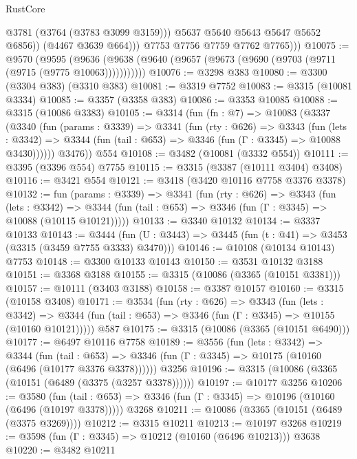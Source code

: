 \begin{lexlean}{RustCore}
\begin{coremodule}
                    @3781
                    (@3764 (@3783 @3099 @3159)))
                  @5637
                  @5640
                  @5643
                  @5647
                  @5652
                  @6856))
              (@4467 @3639 @664)))
          @7753
          @7756
          @7759
          @7762
          @7765)))
@10075 := @9570
    (@9595 (@9636 (@9638 (@9640 (@9657 (@9673 (@9690 (@9703 (@9711 (@9715 (@9775 @10063)))))))))))
@10076 := @3298 @383
@10080 := @3300 (@3304 @383) (@3310 @383)
@10081 := @3319 @7752
@10083 := @3315 (@10081 @3334)
@10085 := @3357 (@3358 @383)
@10086 := @3353 @10085
@10088 := @3315 (@10086 @3383)
@10105 := @3314
    (fun (fn : @7) =>
    @10083
      (@3337
        (@3340
          (fun (params : @3339) =>
          @3341
            (fun (rty : @626) =>
            @3343
              (fun (lets : @3342) =>
              @3344 (fun (tail : @653) => @3346 (fun (Γ : @3345) => @10088 @3430))))))
        @3476))
    @554
@10108 := @3482 (@10081 (@3332 @554))
@10111 := @3395 (@3396 @554) @7755
@10115 := @3315 (@3387 (@10111 @3404) @3408)
@10116 := @3421 @554
@10121 := @3418 (@3420 @10116 @7758 @3376 @3378)
@10132 := fun (params : @3339) =>
  @3341
    (fun (rty : @626) =>
    @3343
      (fun (lets : @3342) =>
      @3344 (fun (tail : @653) => @3346 (fun (Γ : @3345) => @10088 (@10115 @10121)))))
@10133 := @3340 @10132
@10134 := @3337 @10133
@10143 := @3444
    (fun (U : @3443) => @3445 (fun (t : @41) => @3453 (@3315 (@3459 @7755 @3333) @3470)))
@10146 := @10108 (@10134 @10143) @7753
@10148 := @3300 @10133 @10143
@10150 := @3531 @10132 @3188
@10151 := @3368 @3188
@10155 := @3315 (@10086 (@3365 (@10151 @3381)))
@10157 := @10111 (@3403 @3188)
@10158 := @3387 @10157
@10160 := @3315 (@10158 @3408)
@10171 := @3534
    (fun (rty : @626) =>
    @3343
      (fun (lets : @3342) =>
      @3344 (fun (tail : @653) => @3346 (fun (Γ : @3345) => @10155 (@10160 @10121)))))
    @587
@10175 := @3315 (@10086 (@3365 (@10151 @6490)))
@10177 := @6497 @10116 @7758
@10189 := @3556
    (fun (lets : @3342) =>
    @3344
      (fun (tail : @653) =>
      @3346 (fun (Γ : @3345) => @10175 (@10160 (@6496 (@10177 @3376 @3378))))))
    @3256
@10196 := @3315 (@10086 (@3365 (@10151 (@6489 (@3375 (@3257 @3378))))))
@10197 := @10177 @3256
@10206 := @3580
    (fun (tail : @653) => @3346 (fun (Γ : @3345) => @10196 (@10160 (@6496 (@10197 @3378)))))
    @3268
@10211 := @10086 (@3365 (@10151 (@6489 (@3375 @3269))))
@10212 := @3315 @10211
@10213 := @10197 @3268
@10219 := @3598 (fun (Γ : @3345) => @10212 (@10160 (@6496 @10213))) @3638
@10220 := @3482 @10211

\end{coremodule}
\end{lexlean}
